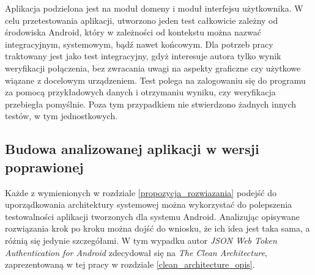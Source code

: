 Aplikacja podzielona jest na moduł domeny i moduł interfejsu użytkownika. W celu przetestowania aplikacji, utworzono jeden test całkowicie zależny od środowiska Android, który w zależności od kontekstu można nazwać integracyjnym, systemowym, bądź nawet końcowym. Dla potrzeb pracy traktowany jest jako test integracyjny, gdyż interesuje autora tylko wynik weryfikacji połączenia, bez zwracania uwagi na aspekty graficzne czy użytkowe wiązane z docelowym urządzeniem. Test polega na zalogowaniu się do programu za pomocą przykładowych danych i otrzymaniu wyniku, czy weryfikacja przebiegła pomyślnie. Poza tym przypadkiem nie stwierdzono żadnych innych testów, w tym jednostkowych.

\subsection{Budowa analizowanej aplikacji w wersji poprawionej}
Każde z wymienionych w rozdziale \ref{propozycja_rozwiazania} podejść do uporządkowania architektury systemowej można wykorzystać do polepszenia testowalności aplikacji tworzonych dla systemu Android. Analizując opisywane rozwiązania krok po kroku można dojść do wniosku, że ich idea jest taka sama, a różnią się jedynie szczegółami. W tym wypadku autor \textit{JSON Web Token Authentication for Android} zdecydował się na \textit{The Clean Architecture}, zaprezentowaną w tej pracy w rozdziale \ref{clean_architecture_opis}.

